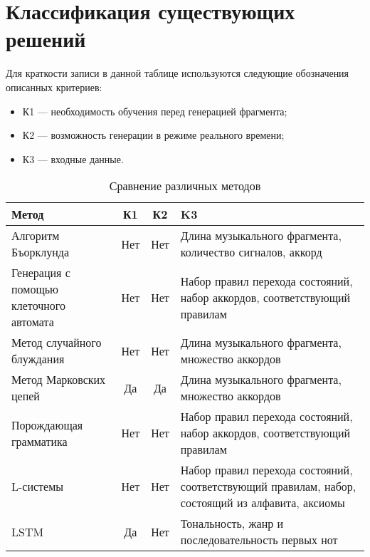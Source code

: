 \chapter{Классификация существующих решений}

Для краткости записи в данной таблице используются следующие обозначения описанных критериев:
\begin{itemize}
	\item К1 --- необходимость обучения перед генерацией фрагмента; 
	\item К2 --- возможность генерации в режиме реального времени;
	\item К3 --- входные данные. 
\end{itemize}


\begin{table}[h]
	\centering
	\caption{Сравнение различных методов}
	\begin{tabular}{|p{5cm}|c|c|p{7cm}|}
		\hline
		\textbf{Метод} & \textbf{К1} & \textbf{К2} & \textbf{K3} \\ \hline
		Алгоритм Бъорклунда & Нет & Нет & Длина музыкального фрагмента, количество сигналов, аккорд \\ \hline
		Генерация с помощью клеточного автомата & Нет & Нет & Набор правил перехода состояний, набор аккордов, соответствующий правилам \\ \hline
		Метод случайного блуждания & Нет & Нет & Длина музыкального фрагмента, множество аккордов \\ \hline
		Метод Марковских цепей & Да & Да & Длина музыкального фрагмента, множество аккордов \\ \hline
		Порождающая грамматика & Нет & Нет & Набор правил перехода состояний, набор аккордов, соответствующий правилам \\ \hline
		L-системы 	& Нет & Нет & Набор правил перехода состояний, соответствующий правилам, набор, состоящий из алфавита, аксиомы \\
		\hline
		LSTM & Да & Нет & Тональность, жанр и последовательность первых нот\\ \hline
	\end{tabular}
	\label{table:methods}
\end{table}
